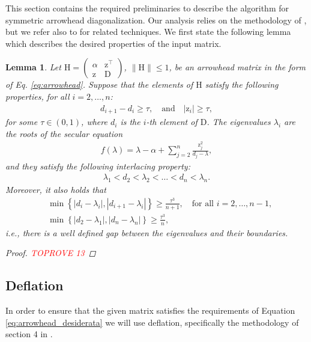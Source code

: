\documentclass{article}
\newcommand{\labs}{\left|}
\newcommand{\rabs}{\right|}
\newcommand{\lcurly}{\left\{}
\newcommand{\rcurly}{\right\}}
\newtheorem{lemma}{Lemma}[section]
\newcommand\vecz{\boldsymbol{\mathrm{z}}}
\newcommand\matD{\boldsymbol{\mathrm{D}}}
\newcommand\matH{\boldsymbol{\mathrm{H}}}
\begin{document}
This section contains the required preliminaries to describe the algorithm for symmetric arrowhead diagonalization. Our analysis relies on the methodology of \cite{gu1995divide}, but we refer also to \cite{o1990computing,stor2015accurate} for related techniques. We first state the following lemma which describes the desired properties of the input matrix.
\begin{lemma}
\label{lemma:arrowhead_preliminaries}
Let $\matH=\begin{pmatrix}
        \alpha & \vecz^\top \\
        \vecz & \matD
\end{pmatrix}$, $\|\matH\|\leq 1$, be an arrowhead matrix in the form of Eq. \eqref{eq:arrowhead}.
Suppose that the elements of $\matH$ satisfy the following properties, for all $i=2,\ldots,n$:
\begin{align}
    \label{eq:arrowhead_desiderata}
    d_{i+1}-d_i \geq \tau, \quad \text{and} \quad |\vecz_i|\geq \tau,
\end{align}
for some $\tau\in(0,1)$, where $d_i$ is the $i$-th element of $\matD$. The eigenvalues $\lambda_i$ are the roots of the secular equation
\begin{align}
    f(\lambda)=\lambda-\alpha+\sum_{j=2}^n \tfrac{\vecz_j^2}{d_j-\lambda},
    \label{eq:arrowhead_secular_equation}
\end{align}
and they satisfy the following interlacing property:
\begin{align}
    \lambda_1 < d_2 < \lambda_2 < \ldots < d_n < \lambda_n.
    \label{eq:arrowhead_interlacing}
\end{align}
Moreover, it also holds that
\begin{align}
    \label{eq:arrowhead_eigenvalue_boundaries_distance}
    &\min\lcurly
        \labs d_i-\lambda_i \rabs,
        \labs d_{i+1}-\lambda_i \rabs
    \rcurly
    \geq
    \frac{\tau^3}{n+1},\quad \text{for all }i=2,\ldots, n-1,\nonumber
    \\
    &\min\lcurly
        \labs d_2-\lambda_1 \rabs,
        \labs d_n-\lambda_n \rabs
    \rcurly
    \geq
    \frac{\tau^3}{n},
\end{align}
i.e., there is a well defined gap between the eigenvalues and their boundaries.
\begin{proof}\textcolor{red}{TOPROVE 13}\end{proof}
\end{lemma}


\subsection{Deflation}
\label{appendix:arrowhead_deflation}
In order to ensure that the given matrix satisfies the requirements of Equation \eqref{eq:arrowhead_desiderata} we will use deflation, specifically the methodology of section 4 in \cite{gu1995divide}.
\end{document}
